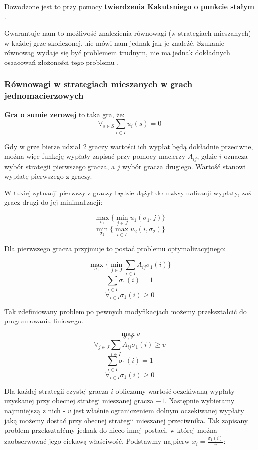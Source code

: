 \documentclass[polish]{standalone}
\begin{document}
Dowodzone jest to przy pomocy \textbf{twierdzenia Kakutaniego o punkcie stałym} \cite[str.~29]{FT-GT}.

Gwarantuje nam to możliwość znalezienia równowagi (w strategiach mieszanych) w każdej grze skończonej, nie mówi nam
jednak jak je znaleźć. Szukanie równowag wydaje się być problemem trudnym, nie ma jednak dokładnych oszacowań złożoności
tego problemu \cite{P-AGI}.

\subsubsection{Równowagi w strategiach mieszanych w grach jednomacierzowych}

\begin{definition}
\textbf{Gra o sumie zerowej} to taka gra, że:
$$\forall_{s \in S} \sum_{i \in I} u_i(s) = 0$$
\end{definition}

Gdy w grze bierze udział 2 graczy wartości ich wypłat będą dokładnie przeciwne, można więc funkcję wypłaty zapisać przy
pomocy macierzy $A_{ij}$, gdzie $i$ oznacza wybór strategii pierwszego gracza, a $j$ wybór gracza drugiego. Wartość
stanowi wypłatę pierwszego z graczy.

W takiej sytuacji pierwszy z graczy będzie dążył do maksymalizacji wypłaty, zaś gracz drugi do jej minimalizacji:

$$\max_{\sigma_1} \{ \min_{j \in J} u_1(\sigma_1, j) \}$$
$$\min_{\sigma_2} \{ \max_{i \in I} u_2(i, \sigma_2) \}$$

Dla pierwszego gracza przyjmuje to postać problemu optymalizacyjnego:

$$\max_{\sigma_1} \{ \min_{j \in J} \sum_{i \in I} A_{ij} \sigma_1(i) \}$$
$$\sum_{i \in I} \sigma_1(i) = 1$$
$$\forall_{i \in I} \sigma_1(i) \geq 0$$

Tak zdefiniowany problem po pewnych modyfikacjach możemy przekształcić do programowania liniowego:

$$\max_{\sigma_1,v} v$$
$$\forall_{j \in J} \sum_{i \in I} A_{ij} \sigma_1(i) \geq v$$
$$\sum_{i \in I} \sigma_1(i) = 1$$
$$\forall_{i \in I} \sigma_1(i) \geq 0$$

Dla każdej strategii czystej gracza $i$ obliczamy wartość oczekiwaną wypłaty uzyskanej przy obecnej strategi mieszanej
gracza $-1$. Następnie wybieramy najmniejszą z nich - $v$ jest właśnie ograniczeniem dolnym oczekiwanej wypłaty jaką
możemy dostać przy obecnej strategii mieszanej przeciwnika. Tak zapisany problem przekształćmy jednak do nieco innej postaci, w której można zaobserwować jego ciekawą właściwość. Podstawmy najpierw $x_i = \frac{\sigma_1(i)}{v}$:
\end{document}
